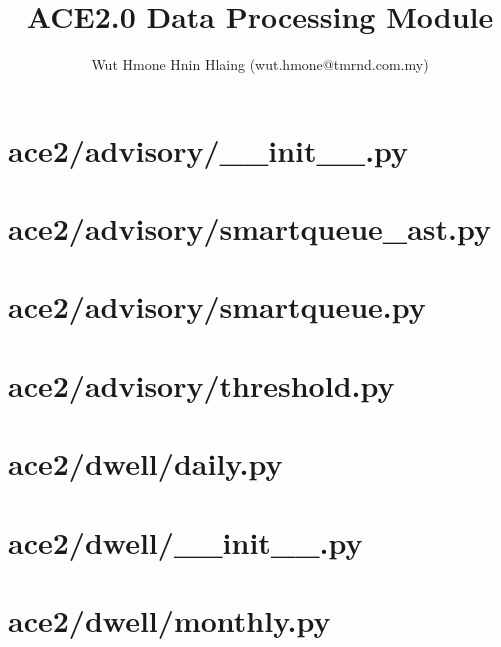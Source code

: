 \documentclass{article}
\begin{document}
\title{ACE2.0 Data Processing Module}
\author{Wut Hmone Hnin Hlaing (wut.hmone@tmrnd.com.my)}

\maketitle

\section*{ace2/advisory/\_\_init\_\_.py}


\section*{ace2/advisory/smartqueue\_ast.py}


\section*{ace2/advisory/smartqueue.py}


\section*{ace2/advisory/threshold.py}


\section*{ace2/dwell/daily.py}


\section*{ace2/dwell/\_\_init\_\_.py}


\section*{ace2/dwell/monthly.py}

\end{document}
